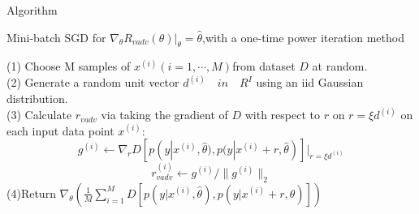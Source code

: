 \begin{frame}{Algorithm }
	\LinesNumberedHidden
	\begin{algorithm}[H]
		\label{1}
		\caption{Mini-batch SGD for $\nabla_\theta R_{vadv}(\theta)|_\theta=\widehat{\theta}$,\quad with a one-time power iteration method }
		(1) Choose M samples of $x^{(i)}(i=1,\cdots,M)$from dataset $D$ at random.\\
		(2) Generate a random unit vector $d^{(i)}\quad in\quad R^I$ using an iid Gaussian distribution.\\
		(3) Calculate $r_{vadv}$ via taking the gradient of $D$ with respect to $r$ on $r=\xi d^{(i)}$ on each input data point $x^{(i)}$:
		\[
		g^{(i)} \gets \nabla_r D[p(y|x^{(i)},\widehat{\theta}),p(y|x^{(i)}+r,\widehat{\theta})]|_{r=\xi d^{(i)}}
		\]
		\[
		r_{vadv}^{(i)} \gets g^{(i)} / \| g^{(i)} \| _2
		\]
		(4)Return $\nabla_\theta(\frac{1}{M}\sum_{i=1}^{M}\mathit{D}[p(y|x^{(i)},\widehat{\theta}),p(y|x^{(i)}+r,\widehat{\theta})])$
		
	\end{algorithm}
\end{frame}


